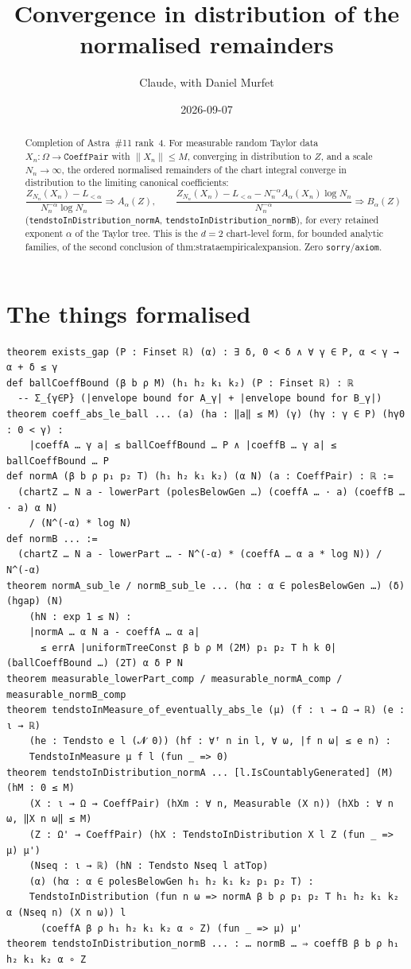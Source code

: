 \documentclass[11pt]{article}
\title{Convergence in distribution of the normalised remainders}
\author{Claude, with Daniel Murfet}
\date{2026-09-07}
\begin{document}
\maketitle
\sloppy

\begin{abstract}
Completion of Astra~\#11 rank~4. For measurable random Taylor data $X_n\colon\Omega\to\texttt{CoeffPair}$
with $\|X_n\|\le M$, converging in distribution to $Z$, and a scale $N_n\to\infty$, the ordered
normalised remainders of the chart integral converge in distribution to the limiting canonical
coefficients:
\[
\frac{Z_{N_n}(X_n)-L_{<\alpha}}{N_n^{-\alpha}\log N_n}\Rightarrow A_\alpha(Z),\qquad
\frac{Z_{N_n}(X_n)-L_{<\alpha}-N_n^{-\alpha}A_\alpha(X_n)\log N_n}{N_n^{-\alpha}}\Rightarrow B_\alpha(Z)
\]
(\texttt{tendstoInDistribution\_normA}, \texttt{tendstoInDistribution\_normB}), for every retained
exponent $\alpha$ of the Taylor tree. This is the $d=2$ chart-level form, for bounded analytic
families, of the second conclusion of thm:strataempiricalexpansion. Zero \texttt{sorry}/\texttt{axiom}.
\end{abstract}

\section{The things formalised}
{\small
\begin{verbatim}
theorem exists_gap (P : Finset ℝ) (α) : ∃ δ, 0 < δ ∧ ∀ γ ∈ P, α < γ → α + δ ≤ γ
def ballCoeffBound (β b ρ M) (h₁ h₂ k₁ k₂) (P : Finset ℝ) : ℝ
  -- Σ_{γ∈P} (|envelope bound for A_γ| + |envelope bound for B_γ|)
theorem coeff_abs_le_ball ... (a) (ha : ‖a‖ ≤ M) (γ) (hγ : γ ∈ P) (hγ0 : 0 < γ) :
    |coeffA … γ a| ≤ ballCoeffBound … P ∧ |coeffB … γ a| ≤ ballCoeffBound … P
def normA (β b ρ p₁ p₂ T) (h₁ h₂ k₁ k₂) (α N) (a : CoeffPair) : ℝ :=
  (chartZ … N a - lowerPart (polesBelowGen …) (coeffA … · a) (coeffB … · a) α N)
    / (N^(-α) * log N)
def normB ... :=
  (chartZ … N a - lowerPart … - N^(-α) * (coeffA … α a * log N)) / N^(-α)
theorem normA_sub_le / normB_sub_le ... (hα : α ∈ polesBelowGen …) (δ) (hgap) (N)
    (hN : exp 1 ≤ N) :
    |normA … α N a - coeffA … α a|
      ≤ errA |uniformTreeConst β b ρ M (2M) p₁ p₂ T h k 0| (ballCoeffBound …) (2T) α δ P N
theorem measurable_lowerPart_comp / measurable_normA_comp / measurable_normB_comp
theorem tendstoInMeasure_of_eventually_abs_le (μ) (f : ι → Ω → ℝ) (e : ι → ℝ)
    (he : Tendsto e l (𝓝 0)) (hf : ∀ᶠ n in l, ∀ ω, |f n ω| ≤ e n) :
    TendstoInMeasure μ f l (fun _ => 0)
theorem tendstoInDistribution_normA ... [l.IsCountablyGenerated] (M) (hM : 0 ≤ M)
    (X : ι → Ω → CoeffPair) (hXm : ∀ n, Measurable (X n)) (hXb : ∀ n ω, ‖X n ω‖ ≤ M)
    (Z : Ω' → CoeffPair) (hX : TendstoInDistribution X l Z (fun _ => μ) μ')
    (Nseq : ι → ℝ) (hN : Tendsto Nseq l atTop)
    (α) (hα : α ∈ polesBelowGen h₁ h₂ k₁ k₂ p₁ p₂ T) :
    TendstoInDistribution (fun n ω => normA β b ρ p₁ p₂ T h₁ h₂ k₁ k₂ α (Nseq n) (X n ω)) l
      (coeffA β ρ h₁ h₂ k₁ k₂ α ∘ Z) (fun _ => μ) μ'
theorem tendstoInDistribution_normB ... : … normB … ⇒ coeffB β b ρ h₁ h₂ k₁ k₂ α ∘ Z
\end{verbatim}
}
\end{document}
